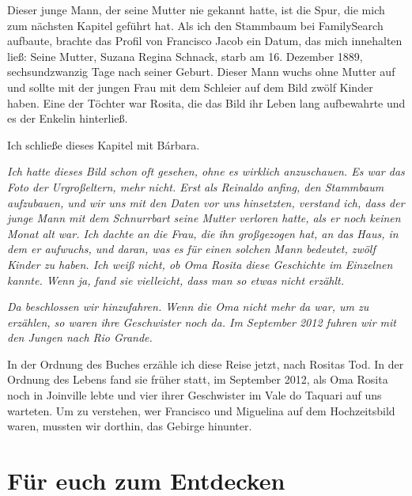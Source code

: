 \documentclass[
  ngerman,
  11pt,
  openany]{book}
\begin{document}
Dieser junge Mann, der seine Mutter nie gekannt hatte, ist die Spur, die
mich zum nächsten Kapitel geführt hat. Als ich den Stammbaum bei
FamilySearch aufbaute, brachte das Profil von Francisco Jacob ein Datum,
das mich innehalten ließ: Seine Mutter, Suzana Regina Schnack, starb am
16. Dezember 1889, sechsundzwanzig Tage nach seiner Geburt. Dieser Mann
wuchs ohne Mutter auf und sollte mit der jungen Frau mit dem Schleier
auf dem Bild zwölf Kinder haben. Eine der Töchter war Rosita, die das
Bild ihr Leben lang aufbewahrte und es der Enkelin hinterließ.

Ich schließe dieses Kapitel mit Bárbara.

\emph{Ich hatte dieses Bild schon oft gesehen, ohne es wirklich
anzuschauen. Es war das Foto der Urgroßeltern, mehr nicht. Erst als
Reinaldo anfing, den Stammbaum aufzubauen, und wir uns mit den Daten vor
uns hinsetzten, verstand ich, dass der junge Mann mit dem Schnurrbart
seine Mutter verloren hatte, als er noch keinen Monat alt war. Ich
dachte an die Frau, die ihn großgezogen hat, an das Haus, in dem er
aufwuchs, und daran, was es für einen solchen Mann bedeutet, zwölf
Kinder zu haben. Ich weiß nicht, ob Oma Rosita diese Geschichte im
Einzelnen kannte. Wenn ja, fand sie vielleicht, dass man so etwas nicht
erzählt.}

\emph{Da beschlossen wir hinzufahren. Wenn die Oma nicht mehr da war, um
zu erzählen, so waren ihre Geschwister noch da. Im September 2012 fuhren
wir mit den Jungen nach Rio Grande.}

In der Ordnung des Buches erzähle ich diese Reise jetzt, nach Rositas
Tod. In der Ordnung des Lebens fand sie früher statt, im September 2012,
als Oma Rosita noch in Joinville lebte und vier ihrer Geschwister im
Vale do Taquari auf uns warteten. Um zu verstehen, wer Francisco und
Miguelina auf dem Hochzeitsbild waren, mussten wir dorthin, das Gebirge
hinunter.

\section{Für euch zum Entdecken}\label{fuxfcr-euch-zum-entdecken-10}
\end{document}
